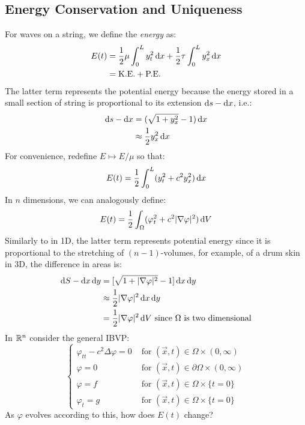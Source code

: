 \documentclass[../main.tex]{subfiles}
\begin{document}
\subsection{Energy Conservation and Uniqueness}
For waves on a string, we define the \textit{energy} as:
\begin{align*}
  E(t) &= \frac{1}{2} \mu \int_{0}^{L} y^2_t \d{x} + \frac{1}{2} \tau \int_{0}^{L} y^2_x \d{x} \\
       &= \text{K.E.} + \text{P.E.}
\end{align*}
The latter term represents the potential energy because the energy stored in a small section of string is proportional to its extension $\d{s} - \d{x}$, i.e.:
\begin{align*}
  \d{s} - \d{x} &= (\sqrt{1 + y^2_x} - 1)\d{x} \\
                &\approx \frac{1}{2} y^2_x \d{x}
\end{align*}
For convenience, redefine $E \mapsto E / \mu$ so that:
\[
  E(t) = \frac{1}{2} \int_{0}^{L} (y^2_t + c^2 y^2_x) \d{x}
\]
In $n$ dimensions, we can analogously define:
\[
  E(t) = \frac{1}{2} \int_{\Omega} (\varphi^2_t + c^2 |\nabla \varphi|^2) \d{V}
\]
Similarly to in 1D, the latter term represents potential energy since it is proportional to the stretching of $(n - 1)$-volumes, for example, of a drum skin in 3D, the difference in areas is:
\begin{align*}
  \d{S} - \d{x}\d{y} &= [\sqrt{1 + |\nabla \varphi|^2} - 1] \d{x}\d{y} \\
                     &\approx \frac{1}{2}|\nabla \varphi|^2 \d{x}\d{y} \\
                     &= \frac{1}{2}|\nabla \varphi|^2 \d{V} \text{ since $\Omega$ is two dimensional}
\end{align*}
In $\mathbb{R}^n$ consider the general IBVP:
\begin{equation}
  \label{waveIBVP}
  \begin{cases}
    \varphi_{t t} - c^2 \Delta \varphi = 0 & \text{ for } (\vec{x}, t) \in \Omega \times (0, \infty) \\
    \varphi = 0 & \text{ for } (\vec{x}, t) \in \partial \Omega \times (0, \infty) \\
    \varphi = f & \text{ for } (\vec{x}, t) \in \Omega \times \{t = 0\} \\
    \varphi_t = g & \text{ for } (\vec{x}, t) \in \Omega \times \{t = 0\}
  \end{cases}
\end{equation}
As $\varphi$ evolves according to this, how does $E(t)$ change?
\end{document}
